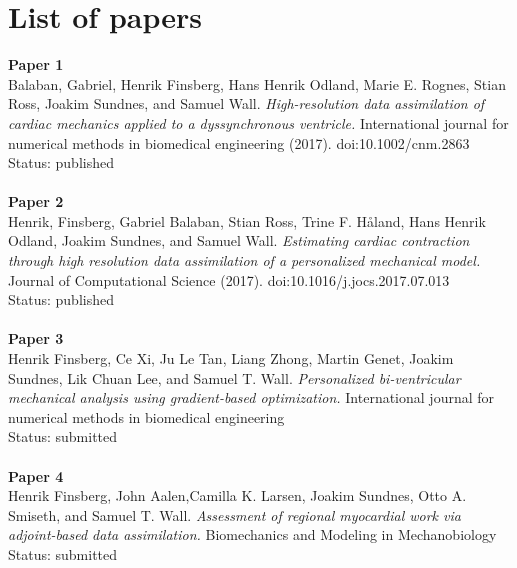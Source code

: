 
\section*{List of papers}

\textbf{Paper 1}
\hfill  \\ \noindent
Balaban, Gabriel, Henrik Finsberg, Hans Henrik Odland, Marie
E. Rognes, Stian Ross, Joakim Sundnes, and Samuel
Wall. \emph{High-resolution data assimilation of cardiac mechanics
  applied to a dyssynchronous ventricle.}  International journal for
numerical methods in biomedical engineering
(2017). doi:10.1002/cnm.2863
Status: published
\\\\
\noindent
\textbf{Paper 2} 
\hfill  \\ 
Henrik, Finsberg, Gabriel Balaban,  Stian Ross, Trine F. H\r{a}land,
Hans Henrik Odland, Joakim Sundnes, and Samuel
Wall. \emph{Estimating cardiac contraction through high resolution
  data assimilation of a personalized mechanical model.} Journal of
Computational Science (2017). doi:10.1016/j.jocs.2017.07.013
\\Status: published
\\\\
\noindent
\textbf{Paper 3}
\hfill  \\
Henrik Finsberg, Ce Xi,  Ju Le Tan,  Liang Zhong, Martin Genet, Joakim
Sundnes, Lik Chuan Lee, and Samuel T. Wall.
\emph{Personalized bi-ventricular mechanical analysis using
  gradient-based optimization.} International journal for
numerical methods in biomedical engineering
\\Status: submitted
\\\\
\noindent
\textbf{Paper 4}
\hfill  \\
Henrik Finsberg, John Aalen,Camilla K.
Larsen, Joakim Sundnes, Otto A. Smiseth, and 
Samuel T. Wall.
\emph{Assessment of regional myocardial work via adjoint-based
  data assimilation.} Biomechanics and Modeling in Mechanobiology
\\Status: submitted

